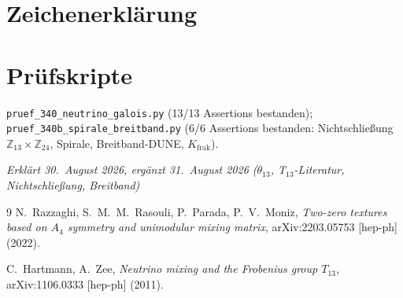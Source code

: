 \section{Zeichenerklärung}



\section{Prüfskripte}

\texttt{pruef\_340\_neutrino\_galois.py} (13/13 Assertions bestanden);\\
\texttt{pruef\_340b\_spirale\_breitband.py} (6/6 Assertions bestanden:
Nichtschließung $\mathbb{Z}_{13}\times\mathbb{Z}_{24}$, Spirale,
Breitband-DUNE, $K_\text{frak}$).

\emph{Erklärt 30.~August 2026, ergänzt 31.~August 2026 ($\theta_{13}$, T$_{13}$-Literatur, Nichtschließung, Breitband)}

\begin{thebibliography}{9}
N.~Razzaghi, S.~M.~M.~Rasouli, P.~Parada, P.~V.~Moniz,
\emph{Two-zero textures based on $A_4$ symmetry and unimodular mixing matrix},
arXiv:2203.05753 [hep-ph] (2022).

C.~Hartmann, A.~Zee,
\emph{Neutrino mixing and the Frobenius group $T_{13}$},
arXiv:1106.0333 [hep-ph] (2011).
\end{thebibliography}


